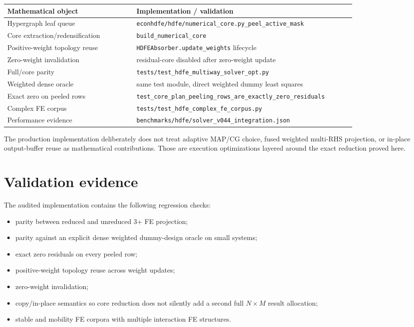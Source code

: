 \documentclass[11pt]{article}
\theoremstyle{definition}
\newcommand{\1}{\mathbf{1}}
\begin{document}
\begin{center}
\begin{tabular}{p{0.33\linewidth}p{0.57\linewidth}}
\toprule
Mathematical object & Implementation / validation \\
\midrule
Hypergraph leaf queue & \texttt{econhdfe/hdfe/numerical\_core.py}\newline\texttt{\_peel\_active\_mask} \\
Core extraction/redensification & \texttt{build\_numerical\_core} \\
Positive-weight topology reuse & \texttt{HDFEAbsorber.update\_weights} lifecycle \\
Zero-weight invalidation & residual-core disabled after zero-weight update \\
Full/core parity & \texttt{tests/test\_hdfe\_multiway\_solver\_opt.py} \\
Weighted dense oracle & same test module, direct weighted dummy least squares \\
Exact zero on peeled rows & \texttt{test\_core\_plan\_peeling\_rows\_}\newline\texttt{are\_exactly\_zero\_residuals} \\
Complex FE corpus & \texttt{tests/test\_hdfe\_complex\_fe\_corpus.py} \\
Performance evidence & \texttt{benchmarks/hdfe/solver\_v044\_integration.json} \\
\bottomrule
\end{tabular}
\end{center}

The production implementation deliberately does not treat adaptive MAP/CG choice, fused weighted multi-RHS projection, or in-place output-buffer reuse as mathematical contributions. Those are execution optimizations layered around the exact reduction proved here.

\section{Validation evidence}

The audited implementation contains the following regression checks:
\begin{itemize}
  \item parity between reduced and unreduced 3+ FE projection;
  \item parity against an explicit dense weighted dummy-design oracle on small systems;
  \item exact zero residuals on every peeled row;
  \item positive-weight topology reuse across weight updates;
  \item zero-weight invalidation;
  \item copy/in-place semantics so core reduction does not silently add a second full $N\times M$ result allocation;
  \item stable and mobility FE corpora with multiple interaction FE structures.
\end{itemize}
\end{document}
